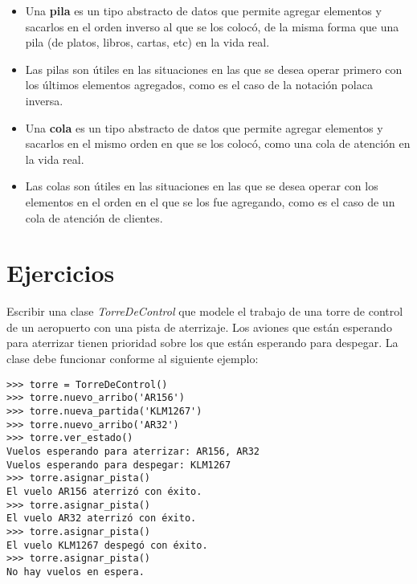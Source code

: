 \begin{itemize}

\item Una {\bf pila} es un tipo abstracto de datos que permite agregar
elementos y sacarlos en el orden inverso al que se los colocó, de la misma
forma que una pila (de platos, libros, cartas, etc) en la vida real.

\item Las pilas son útiles en las situaciones en las que se desea operar
primero con los últimos elementos agregados, como es el caso de la notación
polaca inversa.

\item Una {\bf cola} es un tipo abstracto de datos que permite agregar
elementos y sacarlos en el mismo orden en que se los colocó, como una cola
de atención en la vida real.

\item Las colas son útiles en las situaciones en las que se desea operar
con los elementos en el orden en el que se los fue agregando, como es el
caso de un cola de atención de clientes.

\end{itemize}

\newpage
\section{Ejercicios}

\begin{ejercicio}
Escribir una clase \emph{TorreDeControl} que modele el trabajo de una torre de
control de un aeropuerto con una pista de aterrizaje. Los aviones que están
esperando para aterrizar tienen prioridad sobre los que están esperando para
despegar.  La clase debe funcionar conforme al siguiente ejemplo:

\begin{lstlisting}[numbers=none]
>>> torre = TorreDeControl()
>>> torre.nuevo_arribo('AR156')
>>> torre.nueva_partida('KLM1267')
>>> torre.nuevo_arribo('AR32')
>>> torre.ver_estado()
Vuelos esperando para aterrizar: AR156, AR32
Vuelos esperando para despegar: KLM1267
>>> torre.asignar_pista()
El vuelo AR156 aterrizó con éxito.
>>> torre.asignar_pista()
El vuelo AR32 aterrizó con éxito.
>>> torre.asignar_pista()
El vuelo KLM1267 despegó con éxito.
>>> torre.asignar_pista()
No hay vuelos en espera.
\end{lstlisting}
\end{ejercicio}



